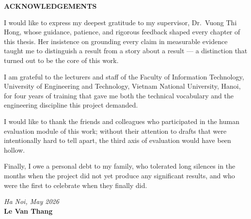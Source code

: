 

\begin{center}
  \textbf{\large{ACKNOWLEDGEMENTS}}
\end{center}

I would like to express my deepest gratitude to my supervisor,
Dr.\ Vuong Thi Hong, whose guidance, patience, and rigorous feedback shaped
every chapter of this thesis. Her insistence on grounding every claim in
measurable evidence taught me to distinguish a result from a story about a
result --- a distinction that turned out to be the core of this work.

I am grateful to the lecturers and staff of the Faculty of Information
Technology, University of Engineering and Technology, Vietnam National
University, Hanoi, for four years of training that gave me both the technical
vocabulary and the engineering discipline this project demanded.

I would like to thank the friends and colleagues who participated in the human
evaluation module of this work; without their attention to drafts that were
intentionally hard to tell apart, the third axis of evaluation would have been
hollow.

Finally, I owe a personal debt to my family, who tolerated long
silences in the months when the project did not yet produce any significant results, and who were
the first to celebrate when they finally did.

\vspace{0.6em}
\begin{flushright}
  \textit{Ha Noi, May 2026}\\
  \textbf{Le Van Thang}
\end{flushright}
